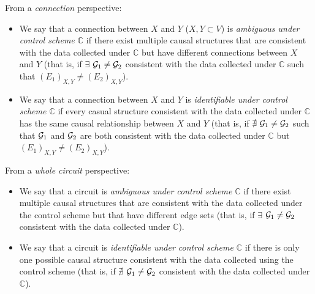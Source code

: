From a \emph{connection} perspective:
\begin{itemize}
    \item We say that a connection between $X$ and $Y$ ($X, Y \subset V$) is \emph{ambiguous under control scheme $\mathbb{C}$} if there exist multiple causal structures that are consistent with the data collected under $\mathbb{C}$ but have different connections between $X$ and $Y$ (that is, if $\exists$ $\mathcal{G}_1 \neq \mathcal{G}_2$ consistent with the data collected under $\mathbb{C}$ such that $(E_1)_{X,Y} \neq (E_2)_{X,Y}$).
    \item We say that a connection between $X$ and $Y$ is \emph{identifiable under control scheme $\mathbb{C}$} if every casual structure consistent with the data collected under $\mathbb{C}$ has the same causal relationship between $X$ and $Y$ (that is, if $\nexists~ \mathcal{G}_1 \neq \mathcal{G}_2$ such that $\mathcal{G}_1$ and $\mathcal{G}_2$ are both consistent with the data collected under $\mathbb{C}$ but $(E_1)_{X,Y} \neq (E_2)_{X,Y}$).
\end{itemize}

From a \emph{whole circuit} perspective:
\begin{itemize}
    \item We say that a circuit is \emph{ambiguous under control scheme $\mathbb{C}$} if there exist multiple causal structures that are consistent with the data collected under the control scheme but that have different edge sets (that is, if $\exists$ $\mathcal{G}_1 \neq \mathcal{G}_2$ consistent with the data collected under $\mathbb{C}$).
    \item We say that a circuit is \emph{identifiable under control scheme $\mathbb{C}$} if there is only one possible causal structure consistent with the data collected using the control scheme (that is, if $\nexists$ $\mathcal{G}_1 \neq \mathcal{G}_2$ consistent with the data collected under $\mathbb{C}$).
\end{itemize}


